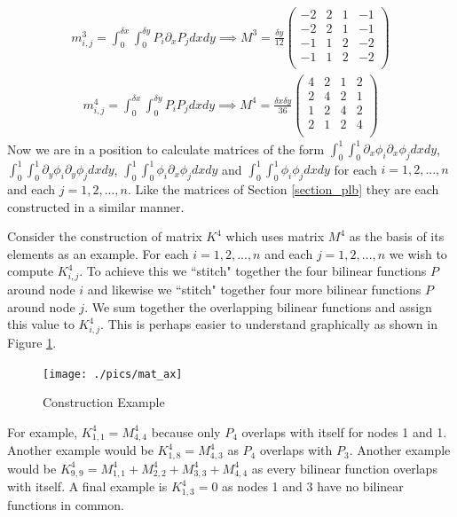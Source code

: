 \documentclass[11pt,fleqn]{article}
\theoremstyle{defstyle}
\begin{document}
\begin{equation}
\begin{aligned}
m^3_{i,j} = \int_0^{\delta x} \int_0^{\delta y} P_i \partial_x P_j dxdy \implies
M^3 = \frac{\delta y}{12}\begin{pmatrix}
-2 & 2 & 1 & -1 \\
-2 & 2 & 1 & -1 \\
-1 & 1 & 2 & -2 \\
-1 & 1 & 2 & -2 \\
\end{pmatrix}
\end{aligned}
\label{eq_pdnx}
\end{equation}
\begin{equation}
\begin{aligned}
m^4_{i,j} = \int_0^{\delta x} \int_0^{\delta y} P_iP_j dxdy \implies
M^4 = \frac{\delta x \delta y}{36}\begin{pmatrix}
4 & 2 & 1 & 2 \\
2 & 4 & 2 & 1 \\
1 & 2 & 4 & 2 \\
2 & 1 & 2 & 4 \\
\end{pmatrix}
\end{aligned}
\label{eq_pnn}
\end{equation}
Now we are in a position to calculate matrices of the form $\int_0^1 \int_0^1 \partial_x\phi_i \partial_x\phi_j dxdy$, $\int_0^1 \int_0^1 \partial_y\phi_i \partial_y\phi_j dxdy$, $\int_0^1 \int_0^1 \phi_i \partial_x\phi_j dxdy$ and $\int_0^1 \int_0^1 \phi_i \phi_j dxdy$ for each $i=1,2,...,n$ and each $j=1,2,...,n$. Like the matrices of Section \ref{section_plb} they are each constructed in a similar manner.

Consider the construction of matrix $K^4$ which uses matrix $M^4$ as the basis of its elements as an example. For each $i=1,2,...,n$ and each $j=1,2,...,n$ we wish to compute $K^4_{i,j}$. To achieve this we ``stitch" together the four bilinear functions $P$ around node $i$ and likewise we ``stitch" together four more bilinear functions $P$ around node $j$. We sum together the overlapping bilinear functions and assign this value to $K^4_{i,j}$. This is perhaps easier to understand graphically as shown in Figure \ref{fig_mat_ex}.
\begin{figure}[H] 
\centering
\texttt{[image: ./pics/mat\_ax]}
\caption{Construction Example} 
\label{fig_mat_ex}
\end{figure} 
For example, $K^4_{1,1} = M^4_{4,4}$ because only $P_4$ overlaps with itself for nodes 1 and 1. Another example would be $K^4_{1,8} = M^4_{4,3}$ as $P_4$ overlaps with $P_3$. Another example would be $K^4_{9,9} = M^4_{1,1} + M^4_{2,2}+ M^4_{3,3}+M^4_{4,4}$ as every bilinear function overlaps with itself. A final example is $K^4_{1,3} = 0$ as nodes 1 and 3 have no bilinear functions in common. 
\end{document}
